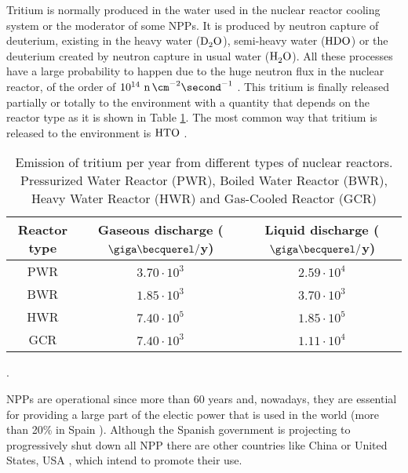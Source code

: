 Tritium is normally produced in the water used in the nuclear reactor cooling system or the moderator of some NPPs. It is produced by neutron capture of deuterium, existing in the heavy water ($\ce{D_2 O}$), semi-heavy water ($\ce{H D O}$) or the deuterium created by neutron capture in usual water ($\ce{H_2 O}$). All these processes have a large probability to happen due to the huge neutron flux in the nuclear reactor, of the order of $10^{14} ~\ce{n} \, \cm^{-2} \second^{-1}$ \cite{CrossSeccionNeutrons}. This tritium is finally released partially or totally to the environment with a quantity that depends on the reactor type as it is shown in Table \ref{tab:TritiumEmisionsNPPs}. The most common way that tritium is released to the environment is $\ce{HTO}$ \cite{CommonEmissionTritium}.

\begin{table}[htbp]
\begin{center}
\begin{tabular}{|c|c|c|}
\hline
Reactor type & Gaseous discharge ($\giga\becquerel/$y) & Liquid discharge ($\giga\becquerel/$y) \\
\hline \hline \hline
PWR & $3.70\cdot 10^{3}$ & $2.59\cdot 10^{4}$ \\ \hline
BWR & $1.85\cdot 10^{3}$ & $3.70\cdot 10^{3}$ \\ \hline
HWR & $7.40\cdot 10^{5}$ & $1.85\cdot 10^{5}$ \\ \hline
GCR & $7.40\cdot 10^{3}$ & $1.11\cdot 10^{4}$ \\ \hline
\end{tabular}
\caption{Emission of tritium per year from different types of nuclear reactors. Pressurized Water Reactor (PWR), Boiled Water Reactor (BWR), Heavy Water Reactor (HWR) and Gas-Cooled Reactor (GCR) \cite{CommonEmissionTritium}}.
\label{tab:TritiumEmisionsNPPs}
\end{center}
\end{table} 

NPPs are operational since more than 60 years and, nowadays, they are essential for providing a large part of the electic power that is used in the world (more than 20\% in Spain \cite{PercentageEnergySpain}). Although the Spanish government is projecting to progressively shut down all NPP there are other countries like China \cite{60ReactorsChina} or United States, USA \cite{35MillionsUSA}, which intend to promote their use.


